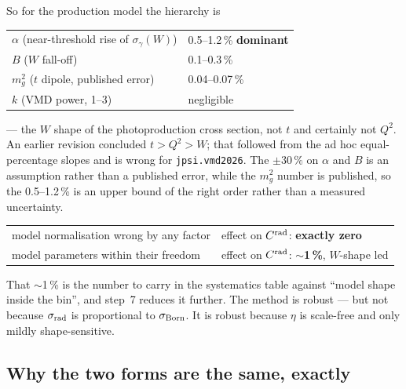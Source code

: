 \documentclass[11pt]{article}
\newcommand{\crad}{C^{\rm rad}}
\begin{document}
So for the production model the hierarchy is
\begin{center}
\begin{tabular}{ll}
\toprule
$\alpha$ (near-threshold rise of $\sigma_\gamma(W)$) & 0.5--1.2\,\% \quad\textbf{dominant} \\
$B$ ($W$ fall-off) & 0.1--0.3\,\% \\
$m_g^2$ ($t$ dipole, published error) & 0.04--0.07\,\% \\
$k$ (VMD power, 1--3) & negligible \\
\bottomrule
\end{tabular}
\end{center}
\noindent --- the $W$ shape of the photoproduction cross section, not $t$ and certainly not $Q^2$. An
earlier revision concluded $t>Q^2>W$; that followed from the ad hoc equal-percentage slopes and is
wrong for \texttt{jpsi.vmd2026}. The $\pm30\,\%$ on $\alpha$ and $B$ is an assumption rather than a
published error, while the $m_g^2$ number is published, so the 0.5--1.2\,\% is an upper bound of the
right order rather than a measured uncertainty.

\begin{center}
\begin{tabular}{ll}
\toprule
model normalisation wrong by any factor & effect on $\crad$: \textbf{exactly zero} \\
model parameters within their freedom & effect on $\crad$: $\sim$\textbf{1\,\%}, $W$-shape led \\
\bottomrule
\end{tabular}
\end{center}

That $\sim$1\,\% is the number to carry in the systematics table against ``model shape inside the
bin'', and step~7 reduces it further. The method is robust --- but not because $\sigma_{\rm rad}$ is
proportional to $\sigma_{\rm Born}$. It is robust because $\eta$ is scale-free and only mildly
shape-sensitive.

\subsection*{Why the two forms are the same, exactly}
\end{document}
